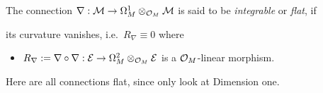 \begin{defn}
  The connection $\nabla:\mathcal{M}\to \Omega_M^1\otimes_{\mathcal{O}_M}\mathcal{M}$ is said to be
  \emph{integrable} or \emph{flat}, if
  \begin{einr}
    its curvature vanishes, i.e.\ $R_\nabla\equiv0$ where
    \begin{itemize}
      \item $R_\nabla:=\nabla\circ\nabla:\mathcal{E}\to\Omega_M^2\otimes_{\mathcal{O}_M}\mathcal{E}$
        is a $\mathcal{O}_M$-linear morphism.
    \end{itemize}
  \end{einr}
  \begin{comment}
    \begin{s-prop}
      \marginnote{\cite[0.12.4]{sabbah2007isomonodromic}}
      The connection $\nabla$ is flat if and only if, in any local basis $e$ of
      $\cM$, the connection matrix $\Omega$ satisfies
      \[
        d\Omega + \Omega \wedge \Omega = 0.
      \]
      This means that the flatness condition is sufficient to assure the
      existence of local fundamental solutions.
    \end{s-prop}
  \end{comment}
  \begin{s-rem}
    Here are all connections flat, since only look at Dimension one.
  \end{s-rem}
  \begin{comment}
    We will say that a connection on a meromorphic bundle is \emph{integrable}
    or \emph{flat} if its restriction to $M\backslash Z$ is an integrable
    connection on the holomorphic bundle $\sM_{|M\backslash Z}$.
  \end{comment}
\end{defn}

